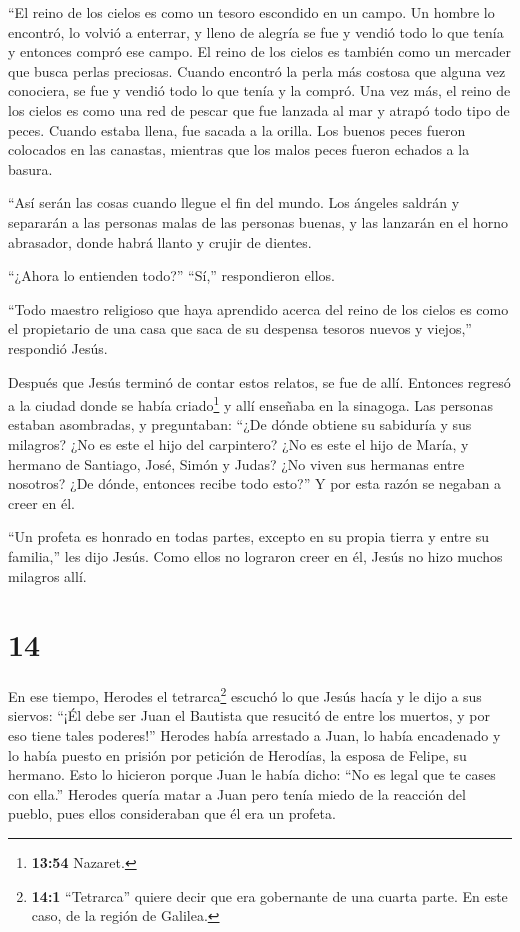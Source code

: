  ``El reino de los cielos es como un tesoro escondido en un
campo. Un hombre lo encontró, lo volvió a enterrar, y lleno de alegría
se fue y vendió todo lo que tenía y entonces compró ese campo.
 El reino de los cielos es también como un mercader que
busca perlas preciosas.  Cuando encontró la perla más
costosa que alguna vez conociera, se fue y vendió todo lo que tenía y la
compró.  Una vez más, el reino de los cielos es como una
red de pescar que fue lanzada al mar y atrapó todo tipo de peces.
 Cuando estaba llena, fue sacada a la orilla. Los buenos
peces fueron colocados en las canastas, mientras que los malos peces
fueron echados a la basura.

 ``Así serán las cosas cuando llegue el fin del mundo. Los
ángeles saldrán y separarán a las personas malas de las personas buenas,
 y las lanzarán en el horno abrasador, donde habrá llanto y
crujir de dientes.

 ``¿Ahora lo entienden todo?'' ``Sí,'' respondieron ellos.

 ``Todo maestro religioso que haya aprendido acerca del
reino de los cielos es como el propietario de una casa que saca de su
despensa tesoros nuevos y viejos,'' respondió Jesús.

 Después que Jesús terminó de contar estos relatos, se fue
de allí.  Entonces regresó a la ciudad donde se había
criado\footnote{\textbf{13:54} Nazaret.} y allí enseñaba en la sinagoga.
Las personas estaban asombradas, y preguntaban: ``¿De dónde obtiene su
sabiduría y sus milagros?  ¿No es este el hijo del
carpintero? ¿No es este el hijo de María, y hermano de Santiago, José,
Simón y Judas?  ¿No viven sus hermanas entre nosotros? ¿De
dónde, entonces recibe todo esto?''  Y por esta razón se
negaban a creer en él.

``Un profeta es honrado en todas partes, excepto en su propia tierra y
entre su familia,'' les dijo Jesús.  Como ellos no lograron
creer en él, Jesús no hizo muchos milagros allí.

\hypertarget{section-13}{%
\section{14}\label{section-13}}

 En ese tiempo, Herodes el tetrarca\footnote{\textbf{14:1}
  ``Tetrarca'' quiere decir que era gobernante de una cuarta parte. En
  este caso, de la región de Galilea.} escuchó lo que Jesús hacía
 y le dijo a sus siervos: ``¡Él debe ser Juan el Bautista
que resucitó de entre los muertos, y por eso tiene tales poderes!''
 Herodes había arrestado a Juan, lo había encadenado y lo
había puesto en prisión por petición de Herodías, la esposa de Felipe,
su hermano.  Esto lo hicieron porque Juan le había dicho:
``No es legal que te cases con ella.''  Herodes quería matar
a Juan pero tenía miedo de la reacción del pueblo, pues ellos
consideraban que él era un profeta.

